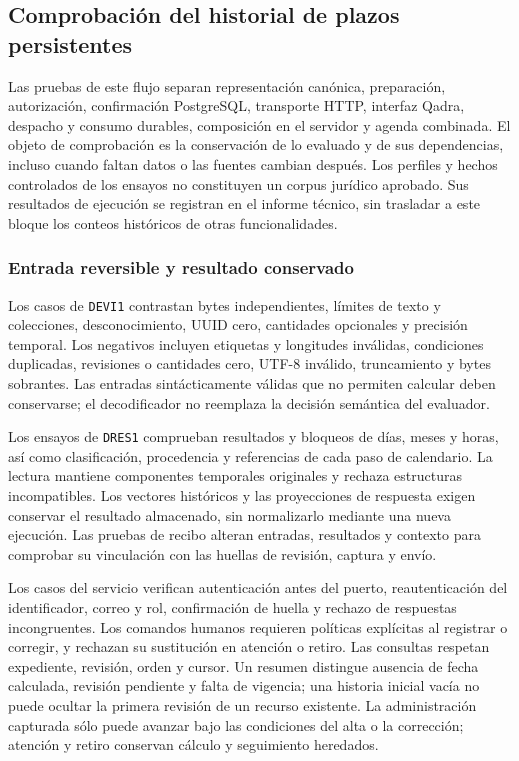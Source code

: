 \subsection{Comprobación del historial de plazos persistentes}\label{sec:pruebas-plazos-persistentes}

Las pruebas de este flujo separan representación canónica, preparación, autorización, confirmación PostgreSQL, transporte HTTP, interfaz Qadra, despacho y consumo durables, composición en el servidor y agenda combinada. El objeto de comprobación es la conservación de lo evaluado y de sus dependencias, incluso cuando faltan datos o las fuentes cambian después. Los perfiles y hechos controlados de los ensayos no constituyen un corpus jurídico aprobado. Sus resultados de ejecución se registran en el informe técnico, sin trasladar a este bloque los conteos históricos de otras funcionalidades.

\subsubsection{Entrada reversible y resultado conservado}

Los casos de \texttt{DEVI1} contrastan bytes independientes, límites de texto y colecciones, desconocimiento, UUID cero, cantidades opcionales y precisión temporal. Los negativos incluyen etiquetas y longitudes inválidas, condiciones duplicadas, revisiones o cantidades cero, UTF-8 inválido, truncamiento y bytes sobrantes. Las entradas sintácticamente válidas que no permiten calcular deben conservarse; el decodificador no reemplaza la decisión semántica del evaluador.

Los ensayos de \texttt{DRES1} comprueban resultados y bloqueos de días, meses y horas, así como clasificación, procedencia y referencias de cada paso de calendario. La lectura mantiene componentes temporales originales y rechaza estructuras incompatibles. Los vectores históricos y las proyecciones de respuesta exigen conservar el resultado almacenado, sin normalizarlo mediante una nueva ejecución. Las pruebas de recibo alteran entradas, resultados y contexto para comprobar su vinculación con las huellas de revisión, captura y envío.

Los casos del servicio verifican autenticación antes del puerto, reautenticación del identificador, correo y rol, confirmación de huella y rechazo de respuestas incongruentes. Los comandos humanos requieren políticas explícitas al registrar o corregir, y rechazan su sustitución en atención o retiro. Las consultas respetan expediente, revisión, orden y cursor. Un resumen distingue ausencia de fecha calculada, revisión pendiente y falta de vigencia; una historia inicial vacía no puede ocultar la primera revisión de un recurso existente. La administración capturada sólo puede avanzar bajo las condiciones del alta o la corrección; atención y retiro conservan cálculo y seguimiento heredados.

